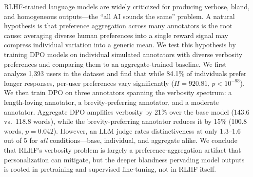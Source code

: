 RLHF-trained language models are widely criticized for producing verbose, bland, and homogeneous outputs---the ``all AI sounds the same'' problem. A natural hypothesis is that preference aggregation across many annotators is the root cause: averaging diverse human preferences into a single reward signal may compress individual variation into a generic mean. We test this hypothesis by training DPO models on individual simulated annotators with diverse verbosity preferences and comparing them to an aggregate-trained baseline. We first analyze 1,393 users in the \prism dataset and find that while 84.1\% of individuals prefer longer responses, per-user preferences vary significantly ($H{=}920.81$, $p{<}10^{-93}$). We then train DPO on three annotators spanning the verbosity spectrum: a length-loving annotator, a brevity-preferring annotator, and a moderate annotator. Aggregate DPO amplifies verbosity by 21\% over the base model (143.6 vs.\ 118.8 words), while the brevity-preferring annotator reduces it by 15\% (100.8 words, $p{=}0.042$). However, an LLM judge rates distinctiveness at only 1.3--1.6 out of 5 for \emph{all} conditions---base, individual, and aggregate alike. We conclude that RLHF's verbosity problem is largely a preference-aggregation artifact that personalization can mitigate, but the deeper blandness pervading model outputs is rooted in pretraining and supervised fine-tuning, not in RLHF itself.
